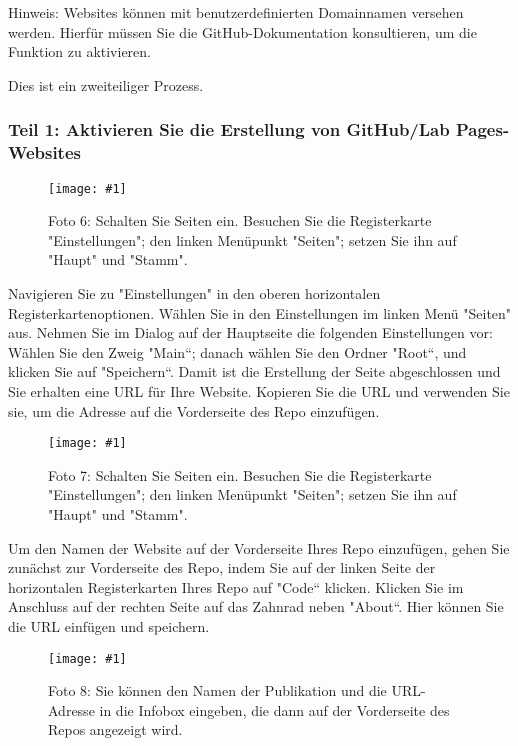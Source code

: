 \documentclass{article}
\newlength{\imgwidth}
\newcommand\scaledgraphics[2]{%
                
\settowidth{\imgwidth}{\texttt{[image: \#1]}}%
                
\setlength{\imgwidth}{\minof{\imgwidth}{#2\textwidth}}%
                
\texttt{[image: \#1]}%
                
}
\begin{document}
Hinweis: Websites können mit benutzerdefinierten Domainnamen versehen werden. Hierfür müssen Sie die GitHub-Dokumentation konsultieren, um die Funktion zu aktivieren.


Dies ist ein zweiteiliger Prozess.


\subsubsection{Teil 1: Aktivieren Sie die Erstellung von GitHub/Lab Pages-Websites}\label{H327158}


\begin{figure}
\scaledgraphics{e61a310c-a521-4f60-81ba-bdfacba7ef99.png}{1}
\caption*{Foto 6: Schalten Sie Seiten ein. Besuchen Sie die Registerkarte "Einstellungen"; den linken Menüpunkt "Seiten"; setzen Sie ihn auf "Haupt" und "Stamm".}\label{F96677601}
\end{figure}


Navigieren Sie zu "Einstellungen" in den oberen horizontalen Registerkartenoptionen. Wählen Sie in den Einstellungen im linken Menü "Seiten" aus. Nehmen Sie im Dialog auf der Hauptseite die folgenden Einstellungen vor: Wählen Sie den Zweig "Main“; danach wählen Sie den Ordner "Root“, und klicken Sie auf "Speichern“. Damit ist die Erstellung der Seite abgeschlossen und Sie erhalten eine URL für Ihre Website. Kopieren Sie die URL und verwenden Sie sie, um die Adresse auf die Vorderseite des Repo einzufügen.

\begin{figure}
\scaledgraphics{c95e502b-6265-4634-98c4-a310aaa0ba5b.png}{1}
\caption*{Foto 7: Schalten Sie Seiten ein. Besuchen Sie die Registerkarte "Einstellungen"; den linken Menüpunkt "Seiten"; setzen Sie ihn auf "Haupt" und "Stamm".}\label{F72487461}
\end{figure}


Um den Namen der Website auf der Vorderseite Ihres Repo einzufügen, gehen Sie zunächst zur Vorderseite des Repo, indem Sie auf der linken Seite der horizontalen Registerkarten Ihres Repo auf "Code“ klicken. Klicken Sie im Anschluss auf der rechten Seite auf das Zahnrad neben "About“. Hier können Sie die URL einfügen und speichern.

\begin{figure}
\scaledgraphics{217faf4f-364b-4d7f-b5cd-ff3483ed5e08.png}{1}
\caption*{Foto 8: Sie können den Namen der Publikation und die URL-Adresse in die Infobox eingeben, die dann auf der Vorderseite des Repos angezeigt wird.}\label{F41996561}
\end{figure}
\end{document}
